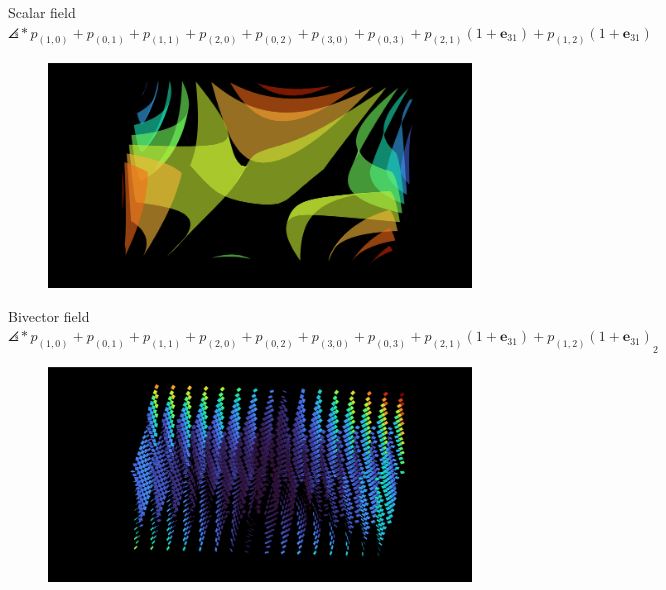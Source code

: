 \documentclass[aspectratio=169,handout]{beamer}
\newcommand{\blade}[1]{\boldsymbol{#1}}
\DeclarePairedDelimiter\angles{\langle}{\rangle}
\newcommand{\proj}[2]{\angles*{#2}_{#1}}
\begin{document}
\begin{frame}{Scalar field}
\vfill
\hspace*{-.5cm}$\proj{}{p_{(1,0)}+p_{(0,1)} + p_{(1,1)} + p_{(2,0)} + p_{(0,2)} + p_{(3,0)} + p_{(0,3)} + p_{(2,1)} (1+\blade{e}_{31}) + p_{(1,2)} (1+\blade{e}_{31}) }$
\begin{figure}[h]
         \centering
         \includegraphics[width=\textwidth]{figures/scalar_field}
\end{figure}
\vfill
\end{frame}

\begin{frame}{Bivector field}
\vfill
\hspace*{-.5cm}$\proj{2}{p_{(1,0)}+p_{(0,1)} + p_{(1,1)} + p_{(2,0)} + p_{(0,2)} + p_{(3,0)} + p_{(0,3)} + p_{(2,1)} (1+\blade{e}_{31}) + p_{(1,2)} (1+\blade{e}_{31}) }$
\begin{figure}[h]
    \centering
    \includegraphics[width=\textwidth]{figures/plane_field}
\end{figure}
\hfill
\vfill
\end{frame}
\end{document}
